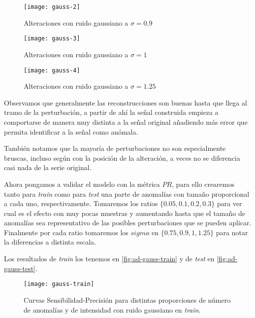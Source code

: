 \begin{figure}[htpb]
  \centering
  \texttt{[image: gauss-2]}
  \caption{Alteraciones con ruido gaussiano a $\sigma = 0.9$}
  \label{fig:ad-gauss-2}
\end{figure}

\begin{figure}[htpb]
  \centering
  \texttt{[image: gauss-3]}
  \caption{Alteraciones con ruido gaussiano a $\sigma = 1$}
  \label{fig:ad-gauss-3}
\end{figure}

\begin{figure}[htpb]
  \centering
  \texttt{[image: gauss-4]}
  \caption{Alteraciones con ruido gaussiano a $\sigma = 1.25$}
  \label{fig:ad-gauss-4}
\end{figure}

Observamos que generalmente las reconstrucciones son buenas hasta que llega al tramo de la perturbación, a partir de ahí la señal construida empieza a comportarse de manera muy distinta a la señal original añadiendo más error que permita identificar a la señal como anómala.

También notamos que la mayoría de perturbaciones no son especialmente bruscas, incluso según con la posición de la alteración, a veces no se diferencia casi nada
de la serie original.

Ahora pongamos a validar el modelo con la métrica $PR$, para ello crearemos tanto para \emph{train} como para \emph{test} una parte de anomalías con tamaño proporcional a cada uno, respectivamente. Tomaremos los ratios $\{0.05, 0.1, 0.2, 0.3\}$ para ver cual es el efecto con muy pocas muestras y aumentando hasta que el tamaño de anomalías sea representativo de las posibles perturbaciones que se pueden aplicar. Finalmente por cada ratio tomaremos los $sigma$ en $\{0.75, 0.9, 1, 1.25\}$ para notar la diferencias a distinta escala.

Los resultados de \emph{train} los tenemos en \autoref{fig:ad-gauss-train} y de \emph{test} en \autoref{fig:ad-gauss-test}.

\begin{figure}[htpb]
  \centering
  \texttt{[image: gauss-train]}
  \caption{Curvas Sensibilidad-Precisión para distintas proporciones de número de anomalías y de intensidad con ruido gaussiano en \emph{train}.}
  \label{fig:ad-gauss-train}
\end{figure}

